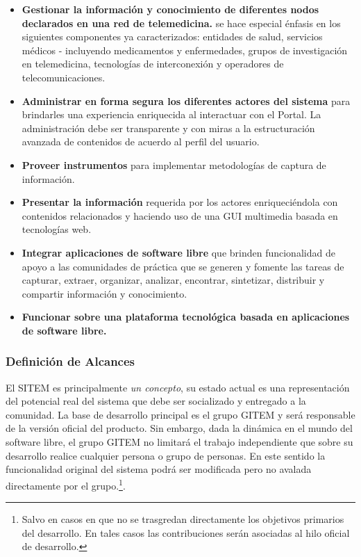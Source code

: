 \begin{itemize}
\item \textbf{Gestionar la información y conocimiento de diferentes nodos declarados en una red de telemedicina.} se hace especial énfasis en los siguientes componentes ya caracterizados: entidades de salud, servicios médicos - incluyendo medicamentos y enfermedades, grupos de investigación en telemedicina, tecnologías de interconexión y operadores de telecomunicaciones.

\item \textbf{Administrar en forma segura los diferentes actores del sistema} para brindarles una experiencia enriquecida al interactuar con el Portal. La administración debe ser transparente y con miras a la estructuración avanzada de contenidos de acuerdo al perfil del usuario.

\item \textbf{Proveer instrumentos} para implementar metodologías de captura de información.

\item \textbf{Presentar la información} requerida por los actores enriqueciéndola con contenidos relacionados y haciendo uso de una GUI multimedia basada en tecnologías web.

\item \textbf{Integrar aplicaciones de software libre} que brinden funcionalidad de apoyo a las comunidades de práctica que se generen y fomente las tareas de capturar, extraer, organizar, analizar, encontrar, sintetizar, distribuir y compartir información y conocimiento. 

\item \textbf{Funcionar sobre una plataforma tecnológica basada en aplicaciones de software libre.}

\end{itemize}


\subsubsection{Definición de Alcances}

El SITEM es principalmente \textit{un concepto}, su estado actual es una representación del potencial real del sistema que debe ser socializado y entregado a la comunidad. La base de desarrollo principal es el grupo GITEM y será responsable de la versión oficial del producto. Sin embargo, dada la dinámica en el mundo del software libre, el grupo GITEM no limitará el trabajo independiente que sobre su desarrollo realice cualquier persona o grupo de personas. En este sentido la funcionalidad original del sistema podrá ser modificada pero no avalada directamente por el grupo.\footnote{Salvo en casos en que no se trasgredan directamente los objetivos primarios del desarrollo. En tales casos las contribuciones serán asociadas al hilo oficial de desarrollo.}. 

